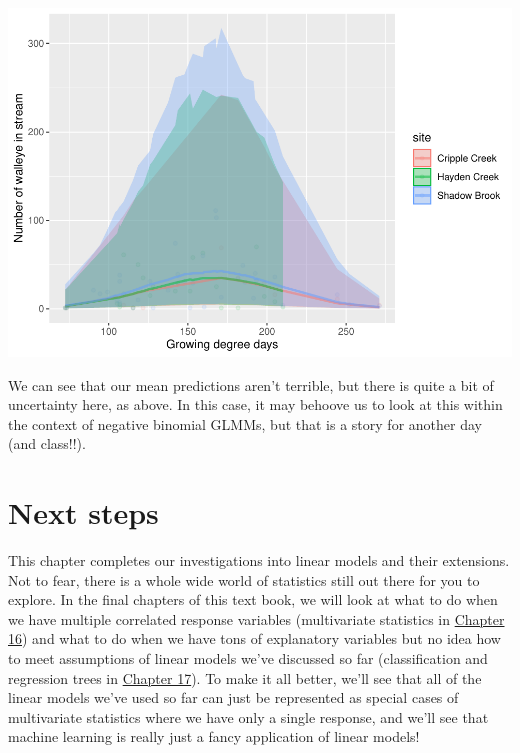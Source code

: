 \documentclass[
]{book}
\begin{document}
\includegraphics{worstr_files/figure-latex/unnamed-chunk-400-1.pdf}

We can see that our mean predictions aren't terrible, but there is quite a bit of uncertainty here, as above. In this case, it may behoove us to look at this within the context of negative binomial GLMMs, but that is a story for another day (and class!!).

\hypertarget{next-15}{%
\section{Next steps}\label{next-15}}

This chapter completes our investigations into linear models and their extensions. Not to fear, there is a whole wide world of statistics still out there for you to explore. In the final chapters of this text book, we will look at what to do when we have multiple correlated response variables (multivariate statistics in \protect\hyperlink{Chapter16}{Chapter 16}) and what to do when we have tons of explanatory variables but no idea how to meet assumptions of linear models we've discussed so far (classification and regression trees in \protect\hyperlink{Chapter17}{Chapter 17}). To make it all better, we'll see that all of the linear models we've used so far can just be represented as special cases of multivariate statistics where we have only a single response, and we'll see that machine learning is really just a fancy application of linear models!

  
\end{document}
